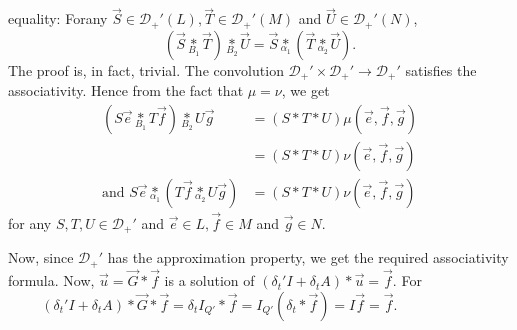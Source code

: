 equality: For\pageoriginale any $\overrightarrow{S} \in
\mathscr{D}_+'(L), \overrightarrow{T} \in \mathscr{D}_+'(M)$ and
$\overrightarrow{U} \in \mathscr{D}_+'(N)$,
$$
(\overrightarrow{S} \underset{B_1}{*} \overrightarrow{T})
\underset{B_2}{*} \overrightarrow{U} = \overrightarrow{S}
\underset{\alpha_1}{*} (\overrightarrow{T} \underset{\alpha_2}{*}
\overrightarrow{U}).
$$
The proof is, in fact, trivial. The convolution $\mathscr{D}_+' \times
\mathscr{D}_+' \to \mathscr{D}_+'$ satisfies the associativity. Hence
from the fact that $\mu = \nu$, we get 
\begin{align*}
(S \overrightarrow{e} \underset{B_1}{*} T \overrightarrow{f})
  \underset{B_2}{*} U \overrightarrow{g} &= (S * T * U) \mu
  (\overrightarrow{e}, \overrightarrow{f}, \overrightarrow{g})\\
&= (S * T * U) \nu (\overrightarrow{e}, \overrightarrow{f},
  \overrightarrow{g})\\
\text{and } S\overrightarrow{e} \underset{\alpha_1}{*} (T
\overrightarrow{f} \underset{\alpha_2}{*} U \overrightarrow{g}) &= (S
* T * U) \nu (\overrightarrow{e}, \overrightarrow{f},
\overrightarrow{g}) 
\end{align*}
for any $S, T, U \in \mathscr{D}_+'$ and $\overrightarrow{e} \in L,
\overrightarrow{f} \in M$ and $\overrightarrow{g} \in N$. 

\noindent Now, since $\mathscr{D}_+'$ has the approximation property,
we get the required associativity formula. Now, $\overrightarrow{u} =
\overrightarrow{G} * \overrightarrow{f}$ is a solution of $(\delta_t'
I + \delta_t A) * \overrightarrow{u} = \overrightarrow{f}$. For
$\hspace{1cm} (\delta_t' I + \delta_t A) * \overrightarrow{G} *
\overrightarrow{f} = \delta_t I_{Q'} * \overrightarrow{f} = I_{Q'}
(\delta_t * \overrightarrow{f}) = I \overrightarrow{f} =
\overrightarrow{f}$.

